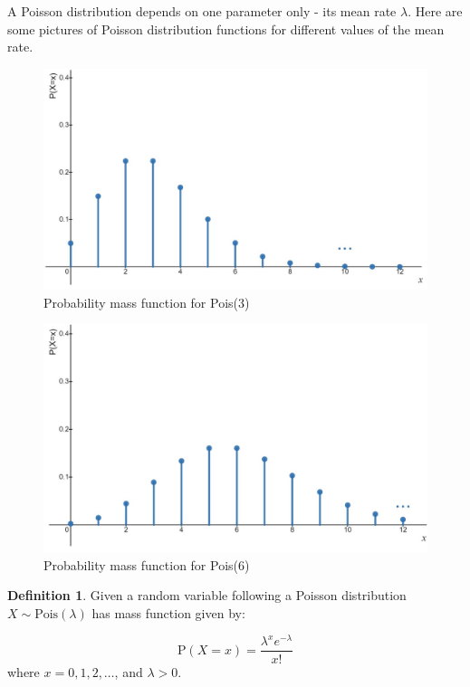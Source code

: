 \documentclass[
]{book}
\theoremstyle{definition}
\newtheorem{definition}{Definition}[chapter]
\theoremstyle{definition}
\theoremstyle{definition}
\theoremstyle{definition}
\theoremstyle{remark}
\begin{document}
A Poisson distribution depends on one parameter only - its mean rate \(\lambda\). Here are some pictures of Poisson distribution functions for different values of the mean rate.

\begin{figure}

{\centering \includegraphics[width=0.75\linewidth]{./figures/poisson1} 

}

\caption{Probability mass function for Pois(3)}\label{fig:pois1}
\end{figure}

\begin{figure}

{\centering \includegraphics[width=0.75\linewidth]{./figures/poisson2} 

}

\caption{Probability mass function for Pois(6)}\label{fig:pois2}
\end{figure}

\begin{definition}
Given a random variable following a Poisson distribution \(X\sim \text{Pois}(\lambda)\) has mass function given by:

\[\text{P}(X=x) = \frac{\lambda^x e^{-\lambda}}{x!} \]
where \(x=0,1,2, \dots\), and \(\lambda>0\).
\end{definition}
\end{document}

